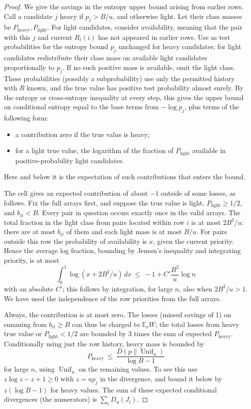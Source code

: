 \begin{proof}
We give the savings in the entropy upper bound arising from earlier rows. Call a candidate \(j\) heavy if \(p_j>B/u\), and otherwise light. Let their class masses be \(P_\mathrm{heavy},P_\mathrm{light}\). For light candidates, consider availability, meaning that the pair with this \(j\) and current \(R_t(i)\) has not appeared in earlier rows. Use as test probabilities for the entropy bound \(p_j\) unchanged for heavy candidates; for light candidates redistribute their class mass on available light candidates proportionally to \(p_j\). If no such positive mass is available, omit the light class. These probabilities (possibly a subprobability) use only the permitted history with \(R\) known, and the true value has positive test probability almost surely. By the entropy or cross-entropy inequality at every step, this gives the upper bound on conditional entropy equal to the base terms from \(-\log p_j\), plus terms of the following form:
\begin{itemize}
\item a contribution zero if the true value is heavy;
\item for a light true value, the logarithm of the fraction of \(P_\mathrm{light}\) available in positive-probability light candidates.

\end{itemize}
Here and below it is the expectation of such contributions that enters the bound.

The cell gives an expected contribution of about \(-1\) outside of some losses, as follows. Fix the full arrays first, and suppose the true value is light, \(P_\mathrm{light}\ge 1/2\), and \(b_{it}<B\). Every pair in question occurs exactly once in the valid arrays. The total fraction in the light class from pairs located within row \(i\) is at most \(2B^2/u\): there are at most \(b_{it}\) of them and each light mass is at most \(B/u\). For pairs outside this row the probability of availability is \(x\), given the current priority. Hence the average log fraction, bounding by Jensen's inequality and integrating priority, is at most
\[
\int_0^1\log(x+2B^2/u)\,dx
\ \le\ -1+C'\frac{B^2}{u}\log n
\]
with an absolute \(C'\); this follows by integration, for large \(n\), also when \(2B^2/u>1\). We have used the independence of the row priorities from the full arrays.

Always, the contribution is at most zero. The losses (missed savings of 1) on summing from \(b_{it}\ge B\) can thus be charged to \(\mathbb E_\nu W\); the total losses from heavy true value or \(P_\mathrm{light}<1/2\) are bounded by 3 times the sum of expected \(P_\mathrm{heavy}\). Conditionally using just the row history, heavy mass is bounded by
\[
P_\mathrm{heavy}\ \le\ \frac{D(p\|\operatorname{Unif}_u)}{\log B-1}
\]
for large \(n\), using \(\operatorname{Unif}_u\) on the remaining values. To see this use \(z\log z-z+1\ge 0\) with \(z=u p_j\) in the divergence, and bound it below by \(z(\log B-1)\) for heavy values. The sum of these expected conditional divergences (the numerators) is \(\sum_i D_\mathrm{u}(J_i)\).


\end{proof}
